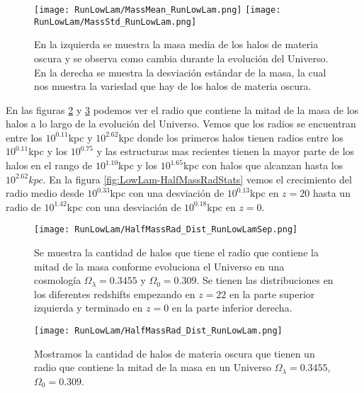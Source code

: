 \begin{figure}[H]
    \centering
    \texttt{[image: RunLowLam/MassMean\_RunLowLam.png]}
    \texttt{[image: RunLowLam/MassStd\_RunLowLam.png]}
    \caption[Media y desviación estándar de la distribución de masa de un Universo $\Omega_\lambda = 0.3455$, $\Omega_0 = 0.309$]{\footnotesize En la izquierda se muestra la masa media de los halos de materia oscura y se observa como cambia durante la evolución del Universo. En la derecha se muestra la desviación estándar de la masa, la cual nos muestra la variedad que hay de los halos de materia oscura.}
    \label{fig:LowLam-MassStats}
\end{figure}

En las figuras \ref{fig:LowLam-HalfMassRadDistSep} y \ref{fig:LowLam-HalfMassRadDist} podemos ver el radio que contiene la mitad de la masa de los halos a lo largo de la evolución del Universo. Vemos que los radios se encuentran entre los $10^{0.11}$kpc y $10^{2.62}$kpc donde los primeros halos tienen radios entre los $10^{0.11}$kpc y los $10^{0.75}$ y las estructuras mas recientes tienen la mayor parte de los halos en el rango de $10^{1.10}$kpc y los $10^{1.65}$kpc con halos que alcanzan hasta los $10^{2.62}kpc$. En la figura \ref{fig:LowLam-HalfMassRadStats} vemos el crecimiento del radio medio desde $10^{0.33}$kpc con una desviación de $10^{0.13}$kpc en $z=20$ hasta un radio de $10^{1.42}$kpc con una desviación de $10^{0.18}$kpc en $z=0$.

\begin{figure}[H]
    \centering
    \texttt{[image: RunLowLam/HalfMassRad\_Dist\_RunLowLamSep.png]}
    \caption[Radio que contiene la mitad de la masa en la evolución de un Universo $\Omega_\lambda = 0.3455$, $\Omega_0 = 0.309$]{\footnotesize Se muestra la cantidad de halos que tiene el radio que contiene la mitad de la masa conforme evoluciona el Universo en una cosmología $\Omega_\lambda = 0.3455$ y $\Omega_0 = 0.309$. Se tienen las distribuciones en los diferentes redshifts empezando en $z=22$ en la parte superior izquierda y terminado en $z=0$ en la parte inferior derecha.}
    \label{fig:LowLam-HalfMassRadDistSep}
\end{figure}

\begin{figure}[H]
    \centering
    \texttt{[image: RunLowLam/HalfMassRad\_Dist\_RunLowLam.png]}
    \caption[Distribución del radio que contiene la mitad de la masa en un Universo $\Omega_\lambda = 0.3455$, $\Omega_0 = 0.309$]{\footnotesize Mostramos la cantidad de halos de materia oscura que tienen un radio que contiene la mitad de la masa en un Universo $\Omega_\lambda = 0.3455$, $\Omega_0 = 0.309$.}
    \label{fig:LowLam-HalfMassRadDist}
\end{figure}

